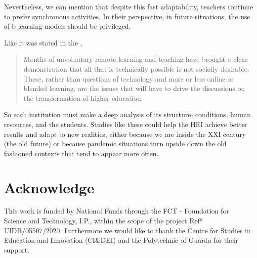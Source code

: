 \documentclass[english]{textolivre}
\begin{document}
Nevertheless, we can mention that despite this fast adaptability, teachers continue to prefer synchronous activities. In their perspective, in future situations, the use of b-learning models should be privileged.

Like it was stated in the \textcite{gaebel2021},

\begin{quote}
    Months of unvoluntary remote learning and teaching have brought a clear demonstration that all that is technically possible is not socially desirable. These, rather than questions of technology and more or less online or blended learning, are the issues that will have to drive the discussions on the transformation of higher education.
\end{quote}

So each institution must make a deep analysis of its structure, conditions, human resources, and the students. Studies like these could help the HEI achieve better results and adapt to new realities, either because we are inside the XXI century (the old future) or because pandemic situations turn upside down the old fashioned contexts that tend to appear more often.

\section*{Acknowledge}
This work is funded by National Funds through the FCT - Foundation for Science and Technology, I.P., within the scope of the project Refª UIDB/05507/2020. Furthermore we would like to thank the Centre for Studies in Education and Innovation (CI\&DEI) and the Polytechnic of Guarda for their support. 



\printbibliography\label{sec-bib}
\end{document}
